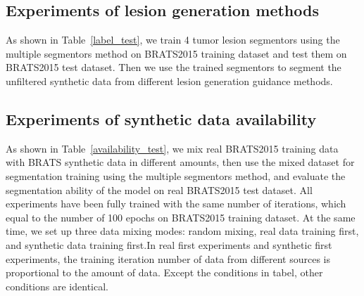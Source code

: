 \documentclass{ecai}
\begin{document}
\subsection{Experiments of lesion generation methods}
\label{label gen methods tests}
As shown in Table~\ref{label_test}, we train 4 tumor lesion segmentors using the multiple segmentors method on BRATS2015 training dataset and test them on BRATS2015 test dataset. Then we use the trained segmentors to segment the unfiltered synthetic data from different lesion generation guidance methods.

\subsection{Experiments of synthetic data availability}
As shown in Table~\ref{availability_test}, we mix real BRATS2015 training data with BRATS synthetic data in different amounts, then use the mixed dataset for segmentation training using the multiple segmentors method, and evaluate the segmentation ability of the model on real BRATS2015 test dataset. All experiments have been fully trained with the same number of iterations, which equal to the number of 100 epochs on BRATS2015 training dataset. At the same time, we set up three data mixing modes: random mixing, real data training first, and synthetic data training first.In real first experiments and synthetic first experiments, the training iteration number of data from different sources is proportional to the amount of data. Except the conditions in tabel, other conditions are identical.
\end{document}

